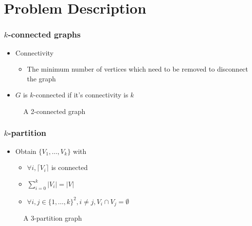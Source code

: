 \section{Problem Description}
\begin{frame}
	\frametitle{$k$-connected graphs}
	\begin{itemize}
		\item Connectivity
			\begin{itemize}
				\item The minimum number of vertices which need to be removed to disconnect the graph 
			\end{itemize}
		\item $G$ is $k$-connected if it's connectivity is $k$
	\end{itemize}
	\begin{figure}
		\begin{center}
			
		\end{center}
		\caption{A 2-connected graph}
	\end{figure}
\end{frame}

\begin{frame}
  \frametitle{$k$-partition}
  \begin{itemize}
  \item Obtain $\{V_1, \dots, V_k\}$ with
    \begin{itemize}
    \item $\forall i, \lceil V_i \rceil$ is connected
    \item $\sum\limits_{i=0}^k|V_i| = |V|$
    \item $\forall i,j \in \{1, \dots, k\}^2, i \neq j, V_i \cap V_j = \emptyset$
    \end{itemize}
  \end{itemize}
  \begin{figure}
    \begin{center}
      
    \end{center}
    \caption{A 3-partition graph}
  \end{figure}
\end{frame}

